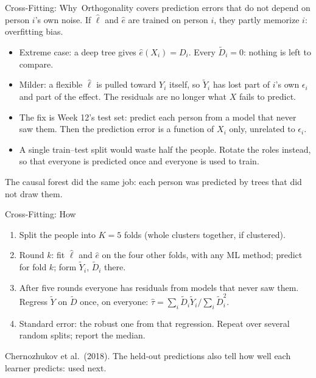 \documentclass[aspectratio=169,11pt,xcolor=dvipsnames]{beamer}
\newcommand{\srct}[1]{#1}
\newcommand{\core}{\,\raisebox{0.6pt}{\textcolor{corestar}{$\bigstar$}}}
\begin{document}
\begin{frame}{Cross-Fitting: Why\core}
Orthogonality covers prediction errors that do not depend on person $i$'s own noise.
If $\hat\ell$ and $\hat e$ are trained on person $i$, they partly memorize $i$: \alert{overfitting bias}.
\vskip4pt
\begin{itemize}\itemsep5pt
  \item Extreme case: a deep tree gives $\hat e(X_i) = D_i$. Every $\tilde D_i = 0$: nothing is left to compare.
  \item Milder: a flexible $\hat\ell$ is pulled toward $Y_i$ itself, so $\tilde Y_i$ has lost part of $i$'s own
        $\epsilon_i$ and part of the effect. The residuals are no longer what $X$ fails to predict.
  \item The fix is Week 12's test set: predict each person from a model that never saw them. Then the
        prediction error is a function of $X_i$ only, unrelated to $\epsilon_i$.
  \item A single train--test split would waste half the people. Rotate the roles instead, so that everyone is
        predicted once and everyone is used to train.
\end{itemize}
\vskip3pt
{\small The causal forest did the same job: each person was predicted by trees that did not draw them.}
\end{frame}

\begin{frame}{Cross-Fitting: How\core}
\begin{center}
\end{center}
\vskip-4pt
\begin{enumerate}\itemsep2pt\small
  \item Split the people into $K = 5$ folds (whole clusters together, if clustered).
  \item Round $k$: fit $\hat\ell$ and $\hat e$ on the four other folds, with any ML method; predict for fold $k$;
        form $\tilde Y_i$, $\tilde D_i$ there.
  \item After five rounds everyone has residuals from models that never saw them. Regress $\tilde Y$ on $\tilde D$
        once, on everyone: $\hat\tau = \sum_i\tilde D_i\tilde Y_i/\sum_i\tilde D_i^2$.
  \item Standard error: the robust one from that regression. Repeat over several random splits; report the median.
\end{enumerate}
\vskip-2pt
{\small \srct{Chernozhukov et al.\ (2018)}. The held-out predictions also tell how well each learner predicts: used next.}
\end{frame}
\end{document}
